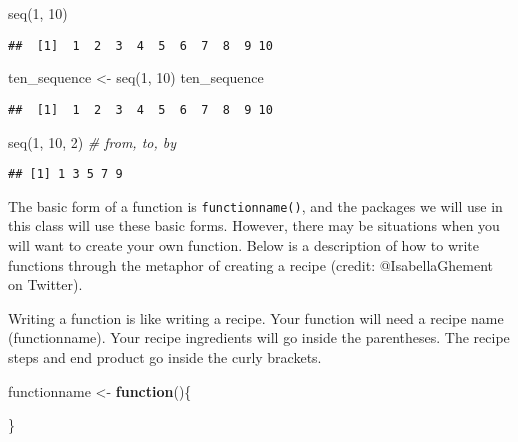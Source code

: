 \documentclass[
]{article}
\newenvironment{Shaded}{\begin{snugshade}}{\end{snugshade}}
\newcommand{\CommentTok}[1]{\textcolor[rgb]{0.56,0.35,0.01}{\textit{#1}}}
\newcommand{\ControlFlowTok}[1]{\textcolor[rgb]{0.13,0.29,0.53}{\textbf{#1}}}
\newcommand{\DecValTok}[1]{\textcolor[rgb]{0.00,0.00,0.81}{#1}}
\newcommand{\FunctionTok}[1]{\textcolor[rgb]{0.00,0.00,0.00}{#1}}
\newcommand{\NormalTok}[1]{#1}
\newcommand{\OtherTok}[1]{\textcolor[rgb]{0.56,0.35,0.01}{#1}}
\begin{document}
\begin{Shaded}
\begin{Highlighting}[]
\FunctionTok{seq}\NormalTok{(}\DecValTok{1}\NormalTok{, }\DecValTok{10}\NormalTok{)}
\end{Highlighting}
\end{Shaded}

\begin{verbatim}
##  [1]  1  2  3  4  5  6  7  8  9 10
\end{verbatim}

\begin{Shaded}
\begin{Highlighting}[]
\NormalTok{ten\_sequence }\OtherTok{\textless{}{-}} \FunctionTok{seq}\NormalTok{(}\DecValTok{1}\NormalTok{, }\DecValTok{10}\NormalTok{)}
\NormalTok{ten\_sequence}
\end{Highlighting}
\end{Shaded}

\begin{verbatim}
##  [1]  1  2  3  4  5  6  7  8  9 10
\end{verbatim}

\begin{Shaded}
\begin{Highlighting}[]
\FunctionTok{seq}\NormalTok{(}\DecValTok{1}\NormalTok{, }\DecValTok{10}\NormalTok{, }\DecValTok{2}\NormalTok{) }\CommentTok{\# from, to, by}
\end{Highlighting}
\end{Shaded}

\begin{verbatim}
## [1] 1 3 5 7 9
\end{verbatim}

The basic form of a function is \texttt{functionname()}, and the
packages we will use in this class will use these basic forms. However,
there may be situations when you will want to create your own function.
Below is a description of how to write functions through the metaphor of
creating a recipe (credit: @IsabellaGhement on Twitter).

Writing a function is like writing a recipe. Your function will need a
recipe name (functionname). Your recipe ingredients will go inside the
parentheses. The recipe steps and end product go inside the curly
brackets.

\begin{Shaded}
\begin{Highlighting}[]
\NormalTok{functionname }\OtherTok{\textless{}{-}} \ControlFlowTok{function}\NormalTok{()\{}
  
\NormalTok{\}}
\end{Highlighting}
\end{Shaded}
\end{document}
